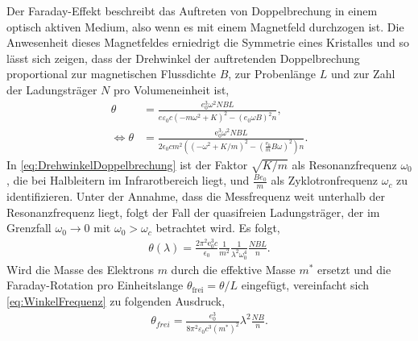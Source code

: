 Der Faraday-Effekt beschreibt das Auftreten von Doppelbrechung in einem optisch aktiven Medium, also wenn es mit einem Magnetfeld durchzogen ist. 
Die Anwesenheit dieses Magnetfeldes erniedrigt die Symmetrie eines Kristalles und so lässt sich zeigen, dass der Drehwinkel der auftretenden Doppelbrechung proportional zur
magnetischen Flussdichte $B$, zur Probenlänge $L$ und zur Zahl der Ladungsträger $N$ pro Volumeneinheit ist,
\begin{align}
    \theta&=\frac{e_0^3\omega^2NBL}{e\varepsilon_0c(-m\omega^2+K)^2-(e_0\omega B)^2n}, \\
    \iff \theta &=\frac{\text{e}_0^3\omega^2NBL}{2\epsilon_0cm^2\left(\left(-\omega^2+K/m\right)^2-\left(\frac{\text{e}_0}{m}B\omega\right)^2\right)n}.
    \label{eq:DrehwinkelDoppelbrechung}
\end{align}
In \eqref{eq:DrehwinkelDoppelbrechung} ist der Faktor $\sqrt{K/m}$ als Resonanzfrequenz $\omega_0$, die bei Halbleitern im Infrarotbereich liegt,  und $\frac{Be_0}{m}$ als 
Zyklotronfrequenz $\omega_c$ zu identifizieren. Unter der Annahme, dass die Messfrequenz weit unterhalb der Resonanzfrequenz liegt, folgt der Fall der quasifreien Ladungsträger, der
im Grenzfall $\omega_0\rightarrow0$ mit $\omega_0>\omega_c$ betrachtet wird. Es folgt,
\begin{align}
    \label{eq:WinkelFrequenz}
    \theta(\lambda)=\frac{2\pi^2\text{e}_0^3c}{\epsilon_0}\frac{1}{m^2}\frac{1}{\lambda^2\omega_0^4}\frac{NBL}{n}.
\end{align}
Wird die Masse des Elektrons $m$ durch die effektive Masse $m^*$ ersetzt und die Faraday-Rotation pro Einheitslange $\theta_{\text{frei}}=\theta/L$ eingefügt, vereinfacht sich
\eqref{eq:WinkelFrequenz} zu folgenden Ausdruck,
\begin{align}
    \theta_{frei}=\frac{e_0^3}{8\pi^2\varepsilon_0c^3(m^*)^2}\lambda^2\frac{NB}{n}.
\end{align}